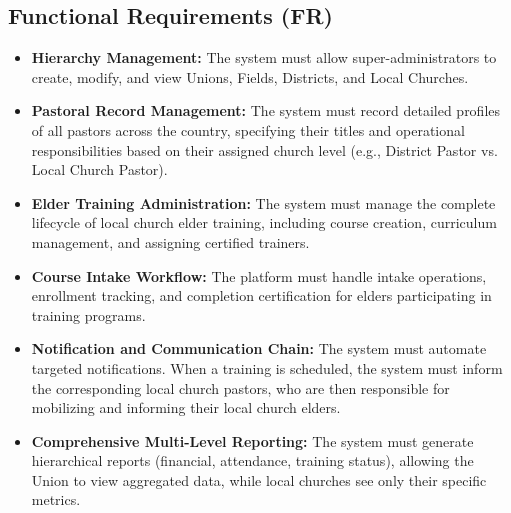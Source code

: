 \documentclass[12pt]{report}
\begin{document}
\subsection{Functional Requirements (FR)}
\begin{itemize}
    \setlength{\itemsep}{0.5em}
    \item \textbf{Hierarchy Management:} The system must allow super-administrators to create, modify, and view Unions, Fields, Districts, and Local Churches.
    \item \textbf{Pastoral Record Management:} The system must record detailed profiles of all pastors across the country, specifying their titles and operational responsibilities based on their assigned church level (e.g., District Pastor vs. Local Church Pastor).
    \item \textbf{Elder Training Administration:} The system must manage the complete lifecycle of local church elder training, including course creation, curriculum management, and assigning certified trainers.
    \item \textbf{Course Intake Workflow:} The platform must handle intake operations, enrollment tracking, and completion certification for elders participating in training programs.
    \item \textbf{Notification and Communication Chain:} The system must automate targeted notifications. When a training is scheduled, the system must inform the corresponding local church pastors, who are then responsible for mobilizing and informing their local church elders.
    \item \textbf{Comprehensive Multi-Level Reporting:} The system must generate hierarchical reports (financial, attendance, training status), allowing the Union to view aggregated data, while local churches see only their specific metrics.
\end{itemize}
\end{document}
